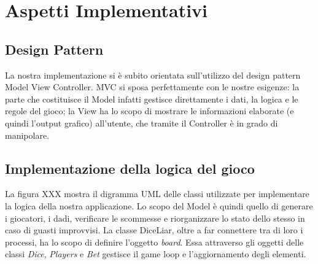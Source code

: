 \documentclass{llncs}
\begin{document}
	\section{Aspetti Implementativi}%
		\subsection{Design Pattern}
			La nostra implementazione si è subito orientata sull'utilizzo del design pattern Model View Controller\cite{MVC}. MVC si sposa perfettamente con le nostre esigenze: la parte che costituisce il Model infatti gestisce direttamente i dati, la logica e le regole del gioco; la View ha lo scopo di mostrare le informazioni elaborate (e quindi l'output grafico) all'utente, che tramite il Controller è in grado di manipolare.
			
		\subsection{Implementazione della logica del gioco}
			La figura XXX mostra il digramma UML delle classi utilizzate per implementare la logica della nostra applicazione. Lo scopo del Model è quindi quello di generare i giocatori, i dadi, verificare le scommesse e riorganizzare lo stato dello stesso in caso di guasti improvvisi. La classe DiceLiar, oltre a far connettere tra di loro i processi, ha lo scopo di definire l'oggetto \textit{board}. Essa attraverso gli oggetti delle classi \textit{Dice}, \textit{Players} e \textit{Bet} gestisce il game loop e l'aggiornamento degli elementi.
			
\end{document}
